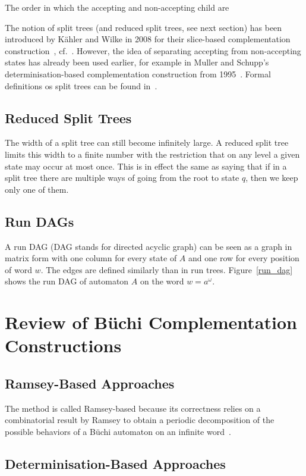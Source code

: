 \documentclass[a4paper]{report}
\begin{document}
The order in which the accepting and non-accepting child are 

The notion of split trees (and reduced split trees, see next section) has been introduced by Kähler and Wilke in 2008 for their slice-based complementation construction~\cite{2008_kaehler}, cf.~\cite{fogarty2013unifying}. However, the idea of separating accepting from non-accepting states has already been used earlier, for example in Muller and Schupp's determinisation-based complementation construction from 1995~\cite{Muller199569}. Formal definitions os split trees can be found in~\cite{2008_kaehler}\cite{fogarty2013unifying}.

\subsection{Reduced Split Trees}
The width of a split tree can still become infinitely large. A reduced split tree limits this width to a finite number with the restriction that on any level a given state may occur at most once. This is in effect the same as saying that if in a split tree there are multiple ways of going from the root to state $q$, then we keep only one of them. 


\subsection{Run DAGs}
A run DAG (DAG stands for directed acyclic graph) can be seen as a graph in matrix form with one column for every state of $A$ and one row for every position of word $w$. The edges are defined similarly than in run trees. Figure~\ref{run_dag} shows the run DAG of automaton $A$ on the word $w = a^\omega$. 

\section{Review of Büchi Complementation Constructions}
\label{review}
\subsection{Ramsey-Based Approaches}
\label{ramsey-based}
The method is called Ramsey-based because its correctness relies on a combinatorial result by Ramsey to obtain a periodic decomposition of the possible behaviors of a Büchi automaton on an infinite word~\cite{2012_breuers}.

\subsection{Determinisation-Based Approaches}
\label{det-based}
\end{document}
